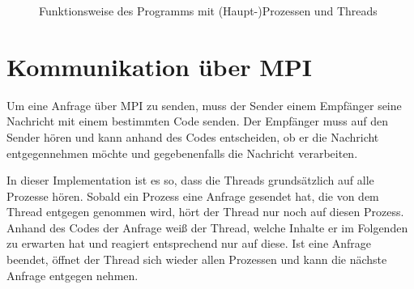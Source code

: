 \documentclass{scrreprt}
\begin{document}
\begin{figure}[!ht]
\centering
{}
\caption{Funktionsweise des Programms mit (Haupt-)Prozessen und Threads}
\label{fig:disthashthreads}
\end{figure}

\section{Kommunikation über MPI}
Um eine Anfrage über MPI zu senden, muss der Sender einem Empfänger seine Nachricht mit einem bestimmten Code senden. Der Empfänger muss auf den Sender hören und kann anhand des Codes entscheiden, ob er die Nachricht entgegennehmen möchte und gegebenenfalls die Nachricht verarbeiten. 

In dieser Implementation ist es so, dass die Threads grundsätzlich auf alle Prozesse hören. Sobald ein Prozess eine Anfrage gesendet hat, die von dem Thread entgegen genommen wird, hört der Thread nur noch auf diesen Prozess. Anhand des Codes der Anfrage weiß der Thread, welche Inhalte er im Folgenden zu erwarten hat und reagiert entsprechend nur auf diese. Ist eine Anfrage beendet, öffnet der Thread sich wieder allen Prozessen und kann die nächste Anfrage entgegen nehmen.
\end{document}

